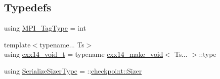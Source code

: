 \subsection*{Typedefs}
\begin{DoxyCompactItemize}
\item 
using \hyperlink{namespacevt_1_1messaging_af700cb74b7b97c1a305267a9eb3ba91a}{M\+P\+I\+\_\+\+Tag\+Type} = int
\item 
{\footnotesize template$<$typename... Ts$>$ }\\using \hyperlink{namespacevt_1_1messaging_a9724e719b301289eb8b3afbf9c44cf46}{cxx14\+\_\+void\+\_\+t} = typename \hyperlink{structvt_1_1messaging_1_1cxx14__make__void}{cxx14\+\_\+make\+\_\+void}$<$ Ts... $>$\+::type
\item 
using \hyperlink{namespacevt_1_1messaging_ad46de1ccda6ed95e8bb11e85c28be878}{Serialize\+Sizer\+Type} = \+::\hyperlink{structcheckpoint_1_1_sizer}{checkpoint\+::\+Sizer}
\end{DoxyCompactItemize}
